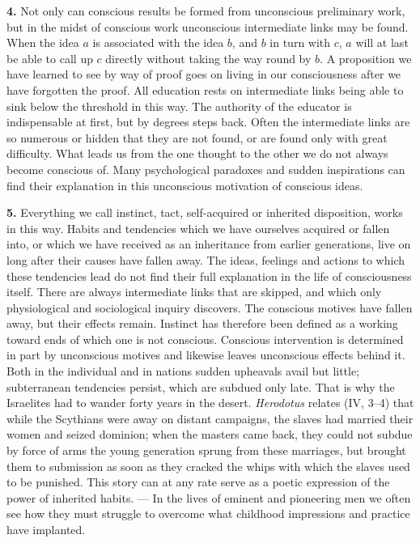 \documentclass[12pt,a4paper]{book}
\newcommand{\opage}[1]{\marginnote{\footnotesize\textit{[#1]}}}
\begin{document}
\textbf{4.} Not only can conscious results be formed from unconscious
preliminary work, but in the midst of conscious work unconscious
intermediate links may be found. When the idea $a$ is associated with the
idea $b$, and $b$ in turn with $c$, $a$ will at last be able to call up
$c$ directly without taking the way round by $b$. A proposition we have
learned to see by way of proof goes on living in our consciousness after
we have forgotten the proof. All education rests on intermediate links
being able to sink below the threshold in this way. The authority of the
educator is indispensable at first, but by degrees steps back. Often the
intermediate links are so numerous or hidden that they are not found, or
are found only with great difficulty. What leads us from the one thought
to the other we do not always become conscious of. Many psychological
paradoxes and sudden inspirations can find their explanation in this
unconscious motivation of conscious ideas.

\textbf{5.} Everything we call instinct, tact, self-acquired or inherited
disposition, works in this way. Habits and tendencies which we have
ourselves acquired or fallen into, or which we have received as an
inheritance from earlier generations, live on long after their causes
have fallen away. The ideas, feelings and actions to which these
tendencies lead do not find their full explanation in the life of
consciousness itself. There are always intermediate links that are
skipped, and which only physiological and sociological inquiry discovers.
The conscious motives have fallen away, but their effects remain.
Instinct has therefore been defined as a working toward ends of which one
is not conscious. Conscious intervention is determined in part by
unconscious motives and likewise leaves unconscious effects behind it.
Both in the individual and in nations sudden upheavals avail but little;
subterranean tendencies persist, which are subdued only late. That is why
the
\opage{90}Israelites had to wander forty years in the desert.
\emph{Herodotus} relates (IV, 3--4) that while the Scythians were away on
distant campaigns, the slaves had married their women and seized
dominion; when the masters came back, they could not subdue by force of
arms the young generation sprung from these marriages, but brought them
to submission as soon as they cracked the whips with which the slaves
used to be punished. This story can at any rate serve as a poetic
expression of the power of inherited habits. --- In the lives of eminent
and pioneering men we often see how they must struggle to overcome what
childhood impressions and practice have implanted.
\end{document}
